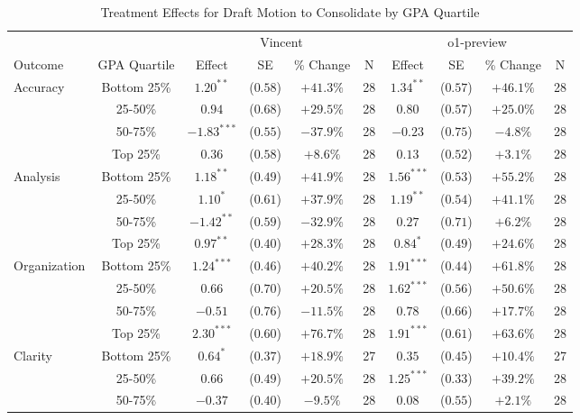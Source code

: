 \begin{table}[!htbp]
\centering
\caption{Treatment Effects for Draft Motion to Consolidate by GPA Quartile}
\label{tab:task5_gpa}
\begin{tabular}{lccccccccc}
\hline\hline
& & \multicolumn{4}{c}{Vincent} & \multicolumn{4}{c}{o1-preview} \\
\cline{3-10}
Outcome & GPA Quartile & Effect & SE & \% Change & N & Effect & SE & \% Change & N \\
\hline
\multirow{4}{*}{Accuracy} & Bottom 25\% & $1.20^{**}$ & ($0.58$) & $+41.3\%$ & 28 & $1.34^{**}$ & ($0.57$) & $+46.1\%$ & 28 \\
& 25-50\% & $0.94$ & ($0.68$) & $+29.5\%$ & 28 & $0.80$ & ($0.57$) & $+25.0\%$ & 28 \\
& 50-75\% & $-1.83^{***}$ & ($0.55$) & $-37.9\%$ & 28 & $-0.23$ & ($0.75$) & $-4.8\%$ & 28 \\
& Top 25\% & $0.36$ & ($0.58$) & $+8.6\%$ & 28 & $0.13$ & ($0.52$) & $+3.1\%$ & 28 \\
\hline
\multirow{4}{*}{Analysis} & Bottom 25\% & $1.18^{**}$ & ($0.49$) & $+41.9\%$ & 28 & $1.56^{***}$ & ($0.53$) & $+55.2\%$ & 28 \\
& 25-50\% & $1.10^{*}$ & ($0.61$) & $+37.9\%$ & 28 & $1.19^{**}$ & ($0.54$) & $+41.1\%$ & 28 \\
& 50-75\% & $-1.42^{**}$ & ($0.59$) & $-32.9\%$ & 28 & $0.27$ & ($0.71$) & $+6.2\%$ & 28 \\
& Top 25\% & $0.97^{**}$ & ($0.40$) & $+28.3\%$ & 28 & $0.84^{*}$ & ($0.49$) & $+24.6\%$ & 28 \\
\hline
\multirow{4}{*}{Organization} & Bottom 25\% & $1.24^{***}$ & ($0.46$) & $+40.2\%$ & 28 & $1.91^{***}$ & ($0.44$) & $+61.8\%$ & 28 \\
& 25-50\% & $0.66$ & ($0.70$) & $+20.5\%$ & 28 & $1.62^{***}$ & ($0.56$) & $+50.6\%$ & 28 \\
& 50-75\% & $-0.51$ & ($0.76$) & $-11.5\%$ & 28 & $0.78$ & ($0.66$) & $+17.7\%$ & 28 \\
& Top 25\% & $2.30^{***}$ & ($0.60$) & $+76.7\%$ & 28 & $1.91^{***}$ & ($0.61$) & $+63.6\%$ & 28 \\
\hline
\multirow{4}{*}{Clarity} & Bottom 25\% & $0.64^{*}$ & ($0.37$) & $+18.9\%$ & 27 & $0.35$ & ($0.45$) & $+10.4\%$ & 27 \\
& 25-50\% & $0.66$ & ($0.49$) & $+20.5\%$ & 28 & $1.25^{***}$ & ($0.33$) & $+39.2\%$ & 28 \\
& 50-75\% & $-0.37$ & ($0.40$) & $-9.5\%$ & 28 & $0.08$ & ($0.55$) & $+2.1\%$ & 28 \\

\end{tabular}
\end{table}

